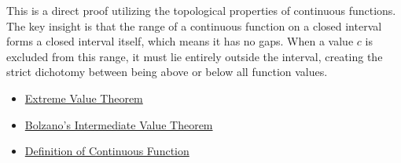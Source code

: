 \begin{remark*}
This is a direct proof utilizing the topological properties of continuous functions. The key insight is that the range of a continuous function on a closed interval forms a closed interval itself, which means it has no gaps. When a value $c$ is excluded from this range, it must lie entirely outside the interval, creating the strict dichotomy between being above or below all function values.
\end{remark*}

\begin{dependencies}
\begin{itemize}
  \item \hyperref[thm:extreme-value-theorem]{Extreme Value Theorem}
  \item \hyperref[thm:bolzano-intermediate-value]{Bolzano's Intermediate Value Theorem}
  \item \hyperref[def:continuous-function]{Definition of Continuous Function}
\end{itemize}
\end{dependencies}

\clearpage
